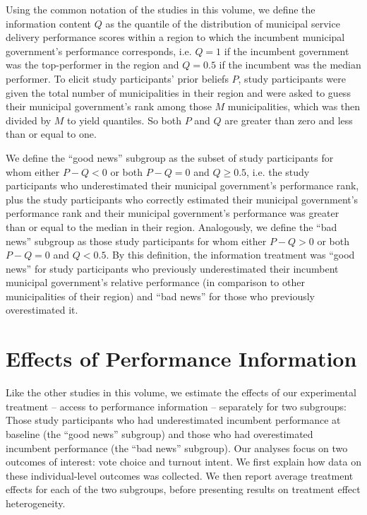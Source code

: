 \documentclass[11pt]{article}
\begin{document}
Using the common notation of the studies in this volume, we define the information content $Q$ as the quantile of the distribution of municipal service delivery performance scores within a region to which the incumbent municipal government's performance corresponds, i.e. $Q=1$ if the incumbent government was the top-performer in the region and $Q=0.5$ if the incumbent was the median performer. To elicit study participants' prior beliefs $P$, study participants were given the total number of municipalities in their region and were asked to guess their municipal government's rank among those $M$ municipalities, which was then divided by $M$ to yield quantiles. So both $P$ and $Q$ are greater than zero and less than or equal to one. 

We define the ``good news'' subgroup as the subset of study participants for whom either $P-Q<0$ or both $P-Q=0$ and $Q\geq0.5$, i.e. the study participants who underestimated their municipal government's performance rank, plus the study participants who correctly estimated their municipal government's performance rank and their municipal government's performance was greater than or equal to the median in their region. Analogously, we define the ``bad news'' subgroup as those study participants for whom either $P-Q>0$ or both $P-Q=0$ and $Q<0.5$. By this definition, the information treatment was ``good news'' for study participants who previously underestimated their incumbent municipal government's relative performance (in comparison to other municipalities of their region) and ``bad news'' for those who previously overestimated it. 

\section{Effects of Performance Information}

Like the other studies in this volume, we estimate the effects of our experimental treatment -- access to performance information -- separately for two subgroups: Those study participants who had underestimated incumbent performance at baseline (the ``good news'' subgroup) and those who had overestimated incumbent performance (the ``bad news'' subgroup). Our analyses focus on two outcomes of interest: vote choice and turnout intent. We first explain how data on these individual-level outcomes was collected. We then report average treatment effects for each of the two subgroups, before presenting results on treatment effect heterogeneity. 
 
\end{document}
